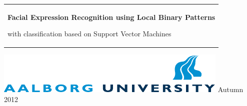 %
%
%
%
\begin{titlepage}
  \addtolength{\hoffset}{0.5\evensidemargin-0.5\oddsidemargin} %
  \noindent%
  \begin{tabular}{@{}p{\textwidth}@{}}
    \vspace{0.2cm}
    \begin{center}
    \Huge{\textbf{
      Facial Expression Recognition using Local Binary Patterns%
    }}
    \end{center}
    \begin{center}
      \Large{
        with classification based on Support Vector Machines%
      }
    \end{center}
    \vspace{0.2cm}\\
  \end{tabular}
  \vspace{4 cm}
  \vfill
  \noindent \includegraphics{figures/aau_logo_en} \hfill {\large Autumn 2012} \\
  \\
	
\end{titlepage}
\clearpage
